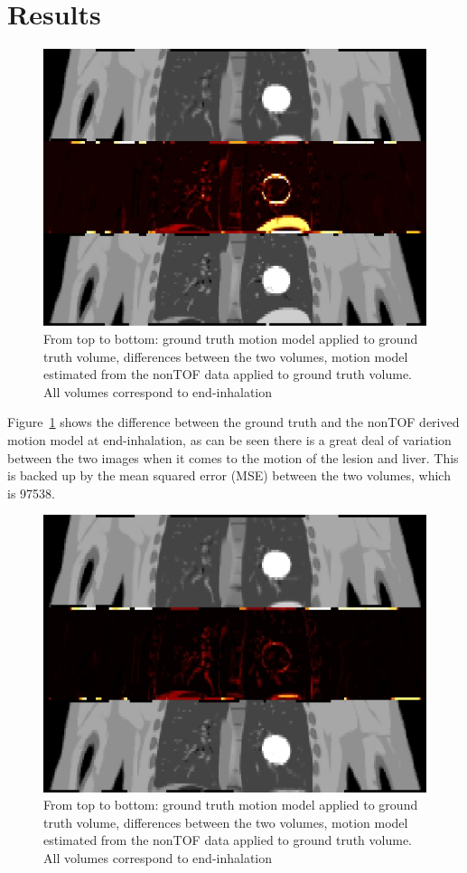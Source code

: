 \documentclass[9pt]{IEEEtran}
\begin{document}
\section{Results}
\begin{figure}
    \centering
    \includegraphics[scale=0.3]{figures/non_tof.png}
    \caption{From top to bottom: ground truth motion model applied to ground truth volume, differences between the two volumes, motion model estimated from the nonTOF data applied to ground truth volume. All volumes correspond to end-inhalation}
    \label{fig:non_tof}
\end{figure}

Figure~\ref{fig:non_tof} shows the difference between the ground truth and the nonTOF derived motion model at end-inhalation, as can be seen there is a great deal of variation between the two images when it comes to the motion of the lesion and liver. This is backed up by the mean squared error (MSE) between the two volumes, which is 97538.

\begin{figure}
    \centering
    \includegraphics[scale=0.3]{figures/tof.png}
    \caption{From top to bottom: ground truth motion model applied to ground truth volume, differences between the two volumes, motion model estimated from the nonTOF data applied to ground truth volume. All volumes correspond to end-inhalation}
    \label{fig:tof}
\end{figure}
\end{document}

